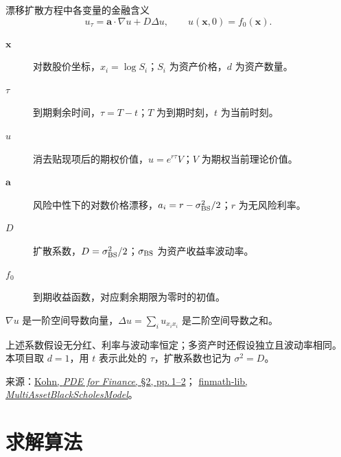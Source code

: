 \documentclass[UTF8,aspectratio=169,10pt]{ctexbeamer}
\begin{document}
\begin{frame}{漂移扩散方程中各变量的金融含义}
\[
u_\tau=\boldsymbol a\cdot\nabla u+D\Delta u,
\qquad u(\boldsymbol x,0)=f_0(\boldsymbol x).
\]
\begin{description}
\item[$\boldsymbol x$] 对数股价坐标，$x_i=\log S_i$；$S_i$ 为资产价格，$d$ 为资产数量。
\item[$\tau$] 到期剩余时间，$\tau=T-t$；$T$ 为到期时刻，$t$ 为当前时刻。
\item[$u$] 消去贴现项后的期权价值，$u=e^{r\tau}V$；$V$ 为期权当前理论价值。
\item[$\boldsymbol a$] 风险中性下的对数价格漂移，$a_i=r-\sigma_{\rm BS}^2/2$；$r$ 为无风险利率。
\item[$D$] 扩散系数，$D=\sigma_{\rm BS}^2/2$；$\sigma_{\rm BS}$ 为资产收益率波动率。
\item[$f_0$] 到期收益函数，对应剩余期限为零时的初值。
\end{description}
$\nabla u$ 是一阶空间导数向量，$\Delta u=\sum_i u_{x_ix_i}$ 是二阶空间导数之和。
\medskip\par
{\small 上述系数假设无分红、利率与波动率恒定；多资产时还假设独立且波动率相同。
本项目取 $d=1$，用 $t$ 表示此处的 $\tau$，扩散系数也记为 $\sigma^2=D$。}
\vfill
{\scriptsize 来源：\href{https://math.nyu.edu/~kohn/pde.finance/2015/section2.pdf}{Kohn, \emph{PDE for Finance}, \S2, pp.\,1--2}；
\href{https://www.finmath.net/finmath-lib/apidocs/net.finmath.lib/net/finmath/montecarlo/assetderivativevaluation/models/MultiAssetBlackScholesModel.html}{finmath-lib, \emph{MultiAssetBlackScholesModel}}。\par}
\end{frame}
\section{求解算法}
\end{document}

